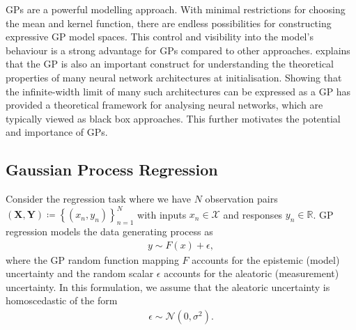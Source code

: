 \documentclass{article}
\numberwithin{equation}{section}
\begin{document}
GPs are a powerful modelling approach. With minimal restrictions for choosing the mean and kernel function, there are endless possibilities for constructing expressive GP model spaces.
This control and visibility into the model's behaviour is a strong advantage for GPs compared to other approaches.
\cite{novak2019neural} explains that the GP is also an important construct for understanding the theoretical properties of many neural network architectures at initialisation.
Showing that the infinite-width limit of many such architectures can be expressed as a GP has provided a theoretical framework for analysing neural networks, which are typically viewed as black box approaches.
This further motivates the potential and importance of GPs.

\subsection{Gaussian Process Regression}
Consider the regression task where we have $N$ observation pairs $(\mathbf{X}, \mathbf{Y}) \coloneqq \left\{(x_n, y_n)\right\}_{n=1}^{N}$ with inputs $x_n \in \mathcal{X}$ and responses $y_n \in \mathbb{R}$. GP regression models the data generating process as
\begin{align}
    y \sim F(x) + \epsilon,
    \label{regression-data-uncertainties}
\end{align}
where the GP random function mapping $F$ accounts for the epistemic (model) uncertainty and the random scalar $\epsilon$ accounts for the aleatoric (measurement) uncertainty. In this formulation, we assume that the aleatoric uncertainty is homoscedastic of the form
\begin{align}
    \epsilon \sim \mathcal{N} \left(0, \sigma^2\right).
    \label{aleotric-uncertainty}
\end{align}
\end{document}
